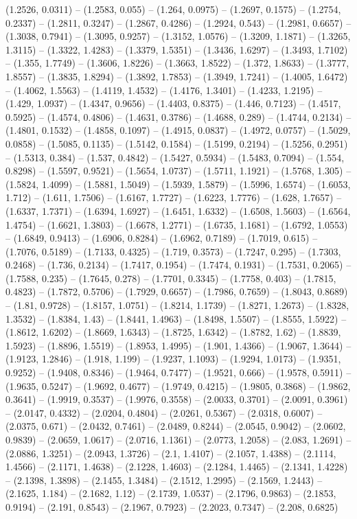 (1.2526, 0.0311) -- (1.2583, 0.055) -- (1.264, 0.0975) -- (1.2697, 0.1575) -- (1.2754, 0.2337) -- (1.2811, 0.3247) -- (1.2867, 0.4286) -- (1.2924, 0.543) -- (1.2981, 0.6657) -- (1.3038, 0.7941) -- (1.3095, 0.9257) -- (1.3152, 1.0576) -- (1.3209, 1.1871) -- (1.3265, 1.3115) -- (1.3322, 1.4283) -- (1.3379, 1.5351) -- (1.3436, 1.6297) -- (1.3493, 1.7102) -- (1.355, 1.7749) -- (1.3606, 1.8226) -- (1.3663, 1.8522) -- (1.372, 1.8633) -- (1.3777, 1.8557) -- (1.3835, 1.8294) -- (1.3892, 1.7853) -- (1.3949, 1.7241) -- (1.4005, 1.6472) -- (1.4062, 1.5563) -- (1.4119, 1.4532) -- (1.4176, 1.3401) -- (1.4233, 1.2195) -- (1.429, 1.0937) -- (1.4347, 0.9656) -- (1.4403, 0.8375) -- (1.446, 0.7123) -- (1.4517, 0.5925) -- (1.4574, 0.4806) -- (1.4631, 0.3786) -- (1.4688, 0.289) -- (1.4744, 0.2134) -- (1.4801, 0.1532) -- (1.4858, 0.1097) -- (1.4915, 0.0837) -- (1.4972, 0.0757) -- (1.5029, 0.0858) -- (1.5085, 0.1135) -- (1.5142, 0.1584) -- (1.5199, 0.2194) -- (1.5256, 0.2951) -- (1.5313, 0.384) -- (1.537, 0.4842) -- (1.5427, 0.5934) -- (1.5483, 0.7094) -- (1.554, 0.8298) -- (1.5597, 0.9521) -- (1.5654, 1.0737) -- (1.5711, 1.1921) -- (1.5768, 1.305) -- (1.5824, 1.4099) -- (1.5881, 1.5049) -- (1.5939, 1.5879) -- (1.5996, 1.6574) -- (1.6053, 1.712) -- (1.611, 1.7506) -- (1.6167, 1.7727) -- (1.6223, 1.7776) -- (1.628, 1.7657) -- (1.6337, 1.7371) -- (1.6394, 1.6927) -- (1.6451, 1.6332) -- (1.6508, 1.5603) -- (1.6564, 1.4754) -- (1.6621, 1.3803) -- (1.6678, 1.2771) -- (1.6735, 1.1681) -- (1.6792, 1.0553) -- (1.6849, 0.9413) -- (1.6906, 0.8284) -- (1.6962, 0.7189) -- (1.7019, 0.615) -- (1.7076, 0.5189) -- (1.7133, 0.4325) -- (1.719, 0.3573) -- (1.7247, 0.295) -- (1.7303, 0.2468) -- (1.736, 0.2134) -- (1.7417, 0.1954) -- (1.7474, 0.1931) -- (1.7531, 0.2065) -- (1.7588, 0.235) -- (1.7645, 0.278) -- (1.7701, 0.3345) -- (1.7758, 0.403) -- (1.7815, 0.4823) -- (1.7872, 0.5706) -- (1.7929, 0.6657) -- (1.7986, 0.7659) -- (1.8043, 0.8689) -- (1.81, 0.9728) -- (1.8157, 1.0751) -- (1.8214, 1.1739) -- (1.8271, 1.2673) -- (1.8328, 1.3532) -- (1.8384, 1.43) -- (1.8441, 1.4963) -- (1.8498, 1.5507) -- (1.8555, 1.5922) -- (1.8612, 1.6202) -- (1.8669, 1.6343) -- (1.8725, 1.6342) -- (1.8782, 1.62) -- (1.8839, 1.5923) -- (1.8896, 1.5519) -- (1.8953, 1.4995) -- (1.901, 1.4366) -- (1.9067, 1.3644) -- (1.9123, 1.2846) -- (1.918, 1.199) -- (1.9237, 1.1093) -- (1.9294, 1.0173) -- (1.9351, 0.9252) -- (1.9408, 0.8346) -- (1.9464, 0.7477) -- (1.9521, 0.666) -- (1.9578, 0.5911) -- (1.9635, 0.5247) -- (1.9692, 0.4677) -- (1.9749, 0.4215) -- (1.9805, 0.3868) -- (1.9862, 0.3641) -- (1.9919, 0.3537) -- (1.9976, 0.3558) -- (2.0033, 0.3701) -- (2.0091, 0.3961) -- (2.0147, 0.4332) -- (2.0204, 0.4804) -- (2.0261, 0.5367) -- (2.0318, 0.6007) -- (2.0375, 0.671) -- (2.0432, 0.7461) -- (2.0489, 0.8244) -- (2.0545, 0.9042) -- (2.0602, 0.9839) -- (2.0659, 1.0617) -- (2.0716, 1.1361) -- (2.0773, 1.2058) -- (2.083, 1.2691) -- (2.0886, 1.3251) -- (2.0943, 1.3726) -- (2.1, 1.4107) -- (2.1057, 1.4388) -- (2.1114, 1.4566) -- (2.1171, 1.4638) -- (2.1228, 1.4603) -- (2.1284, 1.4465) -- (2.1341, 1.4228) -- (2.1398, 1.3898) -- (2.1455, 1.3484) -- (2.1512, 1.2995) -- (2.1569, 1.2443) -- (2.1625, 1.184) -- (2.1682, 1.12) -- (2.1739, 1.0537) -- (2.1796, 0.9863) -- (2.1853, 0.9194) -- (2.191, 0.8543) -- (2.1967, 0.7923) -- (2.2023, 0.7347) -- (2.208, 0.6825) 